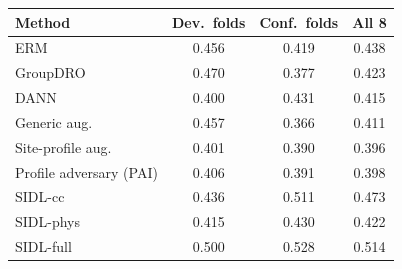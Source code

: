 \begin{tabular}{lccc}
\toprule
Method & Dev.\ folds & Conf.\ folds & All 8 \\
\midrule
ERM & 0.456 & 0.419 & 0.438 \\
GroupDRO & 0.470 & 0.377 & 0.423 \\
DANN & 0.400 & 0.431 & 0.415 \\
Generic aug. & 0.457 & 0.366 & 0.411 \\
Site-profile aug. & 0.401 & 0.390 & 0.396 \\
Profile adversary (PAI) & 0.406 & 0.391 & 0.398 \\
SIDL-cc & 0.436 & 0.511 & 0.473 \\
SIDL-phys & 0.415 & 0.430 & 0.422 \\
SIDL-full & 0.500 & 0.528 & 0.514 \\
\bottomrule
\end{tabular}